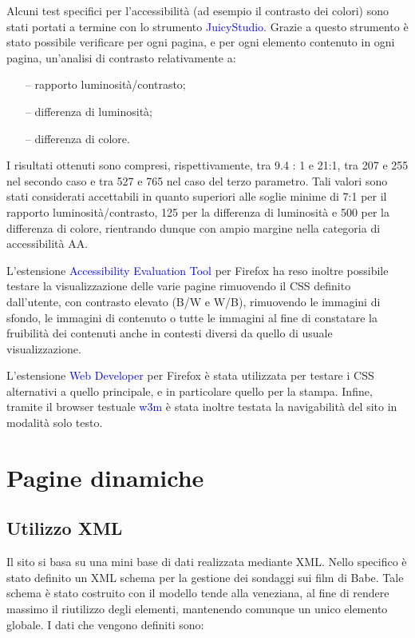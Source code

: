 \documentclass[10pt,a4paper,onecolumn]{article}
\newcommand{\progname}[1]{\textcolor{blue}{\textsf{#1}}}
\begin{document}
Alcuni test specifici per l'accessibilità (ad esempio il contrasto dei colori) sono stati portati a termine con lo strumento \progname{JuicyStudio}. Grazie a questo strumento è stato possibile verificare per ogni pagina, e per ogni elemento contenuto in ogni pagina, un'analisi di contrasto relativamente a:
\begin{itemize}[noitemsep,nolistsep]
  \item[--] rapporto luminosità/contrasto;
  \item[--] differenza di luminosità;
  \item[--] differenza di colore.
\end{itemize}

I risultati ottenuti sono compresi, rispettivamente, tra 9.4 : 1 e 21:1, tra 207 e 255 nel secondo caso e tra 527 e 765 nel caso del terzo parametro. Tali valori sono stati considerati accettabili in quanto superiori alle soglie minime di 7:1 per il rapporto luminosità/contrasto, 125 per la differenza di luminosità e 500 per la differenza di colore, rientrando dunque con ampio margine nella categoria di accessibilità AA\@.

L'estensione \progname{Accessibility Evaluation Tool} per Firefox ha reso inoltre possibile testare la visualizzazione delle varie pagine rimuovendo il CSS definito dall'utente, con contrasto elevato (B/W e W/B), rimuovendo le immagini di sfondo, le immagini di contenuto o tutte le immagini al fine di constatare la fruibilità dei contenuti anche in contesti diversi da quello di usuale visualizzazione.

L'estensione \progname{Web Developer} per Firefox è stata utilizzata per testare i CSS alternativi a quello principale, e in particolare quello per la stampa. Infine, tramite il browser testuale \progname{w3m} è stata inoltre testata la navigabilità del sito in modalità solo testo. 

\section{Pagine dinamiche}

\subsection{Utilizzo XML}

Il sito si basa su una mini base di dati realizzata mediante XML. Nello specifico è stato definito un XML schema per la gestione dei sondaggi sui film di Babe. Tale schema è stato costruito con il modello tende alla veneziana, al fine di rendere massimo il riutilizzo degli elementi, mantenendo comunque un unico elemento globale. I dati che vengono definiti sono:
\end{document}
